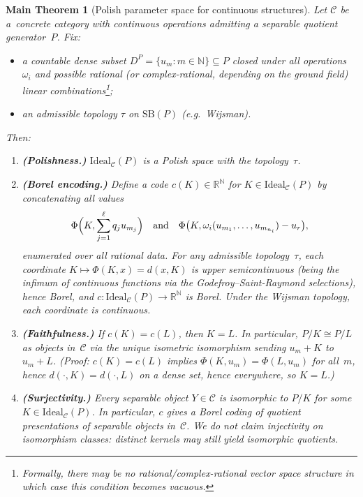 \documentclass[12pt,fleqn,a4paper]{amsart}
\numberwithin{equation}{section}
\newtheorem{mainthm}[theorem]{Main Theorem}
\theoremstyle{definition}
\newcommand{\N}{\mathbb{N}}
\newcommand{\R}{\mathbb{R}}
\newcommand{\SB}{\mathrm{SB}}
\newcommand{\Ideal}{\mathrm{Ideal}}
\begin{document}
\begin{mainthm}[Polish parameter space for continuous structures]\label{thm:continuous-main}
Let $\mathcal{C}$ be a~concrete category with continuous operations admitting a
separable quotient generator~$P$.  Fix:
\begin{itemize}
\item a countable dense subset $D^P=\{u_m:m\in\N\}\subseteq P$ closed under all
operations~$\omega_i$ and possible rational (or complex-rational, depending on the ground field) linear combinations\footnote{Formally, there may be no rational/complex-rational vector space structure in which case this condition becomes vacuous.};
\item an admissible topology $\tau$ on $\SB(P)$ (e.g.\ Wijsman).
\end{itemize}
Then:
\begin{enumerate}
\item \textbf{(Polishness.)}
$\Ideal_{\mathcal C}(P)$ is a Polish space with the topology~$\tau$.

\item \textbf{(Borel encoding.)}
Define a code $c(K)\in\R^\N$ for $K\in\Ideal_{\mathcal C}(P)$ by
concatenating all values
\[
\Phi\Bigl(K,\sum_{j=1}^\ell q_j u_{m_j}\Bigr)
\quad\text{and}\quad
\Phi\bigl(K,\omega_i(u_{m_1},\dots,u_{m_{n_i}})-u_r\bigr),
\]
enumerated over all rational data.  For any admissible topology~$\tau$,
each coordinate $K\mapsto\Phi(K,x)=d(x,K)$ is upper semicontinuous
(being the infimum of continuous functions via the
Godefroy--Saint-Raymond selections), hence Borel, and
$c:\Ideal_{\mathcal C}(P)\to\R^\N$ is Borel.
Under the \emph{Wijsman} topology, each coordinate is continuous.

\item \textbf{(Faithfulness.)}
If $c(K)=c(L)$, then $K=L$.  In particular, $P/K\cong P/L$ as objects in~$\mathcal C$
via the unique isometric isomorphism sending $u_m+K$ to $u_m+L$.
(\emph{Proof:} $c(K)=c(L)$ implies $\Phi(K,u_m)=\Phi(L,u_m)$ for all~$m$, hence
$d(\cdot,K)=d(\cdot,L)$ on a dense set, hence everywhere, so $K=L$.)

\item \textbf{(Surjectivity.)}
Every separable object $Y\in\mathcal C$ is isomorphic to $P/K$ for some
$K\in\Ideal_{\mathcal C}(P)$.  In particular, $c$ gives a Borel coding of
quotient presentations of separable objects in~$\mathcal C$.
We do \emph{not} claim injectivity on isomorphism classes: distinct kernels may
still yield isomorphic quotients.


\end{enumerate}
\end{mainthm}
\end{document}
